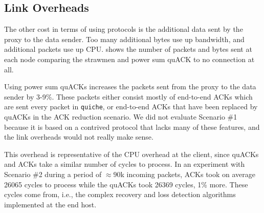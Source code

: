 
\subsection{Link Overheads}



The other cost in terms of using \sys protocols is the additional data
sent by the proxy to the data sender.
Too many additional bytes use up bandwidth, and additional packets use
up CPU\@.
 shows the number of packets and bytes sent at each
node comparing the strawmen and power sum quACK to no \sys connection at all.

Using power sum quACKs increases the packets sent from the proxy to the data
sender
by 3-9\%. These packets either consist mostly
of end-to-end ACKs which are sent every packet in \texttt{quiche}, or end-to-end
ACKs that have been replaced by quACKs in the ACK reduction scenario.
We did not evaluate Scenario \#1 because it is based
on a contrived protocol that lacks many of these features, and the link
overheads would not really make sense.

This overhead is representative of the CPU overhead at the client, since
quACKs and ACKs take a similar number of cycles to process. In an experiment
with Scenario \#2 during a period of $\approx90$k incoming packets, ACKs took on
average 26065 cycles to process while the quACKs took 26369 cycles, 1\% more.
These cycles come from, i.e., the complex recovery and loss detection algorithms
implemented at the end host.


